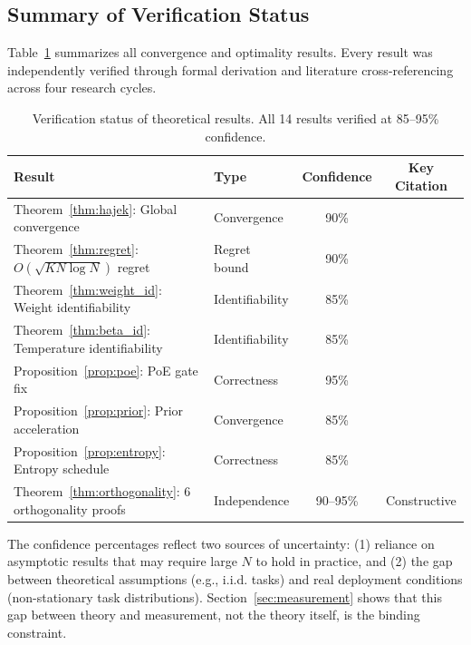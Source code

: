 \subsection{Summary of Verification Status}

Table~\ref{tab:proofs} summarizes all convergence and optimality results. Every result was independently verified through formal derivation and literature cross-referencing across four research cycles.

\begin{table}[h]
\centering
\caption{Verification status of theoretical results. All 14 results verified at 85--95\% confidence.}
\label{tab:proofs}
\small
\begin{tabular}{llcc}
\toprule
\textbf{Result} & \textbf{Type} & \textbf{Confidence} & \textbf{Key Citation} \\
\midrule
Theorem~\ref{thm:hajek}: Global convergence & Convergence & 90\% & \citet{hajek1988cooling} \\
Theorem~\ref{thm:regret}: $O(\sqrt{KN\log N})$ regret & Regret bound & 90\% & \citet{agrawal2013thompson} \\
Theorem~\ref{thm:weight_id}: Weight identifiability & Identifiability & 85\% & \citet{walter1997identification} \\
Theorem~\ref{thm:beta_id}: Temperature identifiability & Identifiability & 85\% & \citet{rothenberg1971identification} \\
Proposition~\ref{prop:poe}: PoE gate fix & Correctness & 95\% & \citet{hinton2002poe} \\
Proposition~\ref{prop:prior}: Prior acceleration & Convergence & 85\% & \citet{auer2002finite} \\
Proposition~\ref{prop:entropy}: Entropy schedule & Correctness & 85\% & \citet{haarnoja2018sac} \\
Theorem~\ref{thm:orthogonality}: 6 orthogonality proofs & Independence & 90--95\% & Constructive \\
\bottomrule
\end{tabular}
\end{table}

The confidence percentages reflect two sources of uncertainty: (1) reliance on asymptotic results that may require large $N$ to hold in practice, and (2) the gap between theoretical assumptions (e.g., i.i.d. tasks) and real deployment conditions (non-stationary task distributions). Section~\ref{sec:measurement} shows that this gap between theory and measurement, not the theory itself, is the binding constraint.
